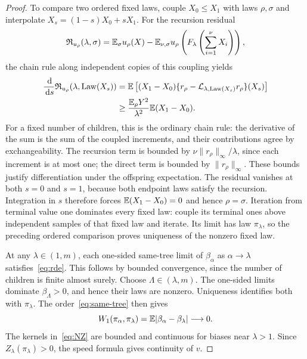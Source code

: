 \begin{proof}
To compare two ordered fixed laws, couple $X_0\le X_1$ with laws $\rho,\sigma$ and interpolate $X_s=(1-s)X_0+sX_1$. For the recursion residual
\begin{equation*}
 \mathfrak R_{u_\rho}(\lambda,\sigma)
 =\mathbb E_\sigma u_\rho(X)
 -\mathbb E_{\nu,\sigma}u_\rho\left(F_\lambda\left(\sum_{i=1}^{\nu}X_i\right)\right),
\end{equation*}
the chain rule along independent copies of this coupling yields
\begin{align*}
 \frac{\,\mathrm d}{\,\mathrm d s}\mathfrak R_{u_\rho}(\lambda,\operatorname{Law}(X_s))
 &=\mathbb E\left[(X_1-X_0)
 \{r_\rho-\mathcal L_{\lambda,\operatorname{Law}(X_s)}r_\rho\}(X_s)\right]\\
 &\ge\frac{\mathbb E_\rho Y^2}{\lambda^2}\mathbb E(X_1-X_0).
\end{align*}
For a fixed number of children, this is the ordinary chain rule: the derivative of the sum is the sum of the coupled increments, and their contributions agree by exchangeability. The recursion term is bounded by $\nu\|r_\rho\|_\infty/\lambda$, since each increment is at most one; the direct term is bounded by $\|r_\rho\|_\infty$. These bounds justify differentiation under the offspring expectation. The residual vanishes at both $s=0$ and $s=1$, because both endpoint laws satisfy the recursion. Integration in $s$ therefore forces $\mathbb E(X_1-X_0)=0$ and hence $\rho=\sigma$. Iteration from terminal value one dominates every fixed law: couple its terminal ones above independent samples of that fixed law and iterate. Its limit has law $\pi_\lambda$, so the preceding ordered comparison proves uniqueness of the nonzero fixed law.

At any $\lambda\in(1,m)$, each one-sided same-tree limit of $\beta_\alpha$ as $\alpha\to\lambda$ satisfies~\eqref{eq:rde}. This follows by bounded convergence, since the number of children is finite almost surely. Choose $\Lambda\in(\lambda,m)$. The one-sided limits dominate $\beta_\Lambda>0$, and hence their laws are nonzero. Uniqueness identifies both with $\pi_\lambda$. The order~\eqref{eq:same-tree} then gives
\begin{equation*}
 W_1(\pi_\alpha,\pi_\lambda)
 =\mathbb E|\beta_\alpha-\beta_\lambda|\longrightarrow0.
\end{equation*}
The kernels in~\eqref{eq:NZ} are bounded and continuous for biases near $\lambda>1$. Since $Z_\lambda(\pi_\lambda)>0$, the speed formula gives continuity of $v$.
\end{proof}

